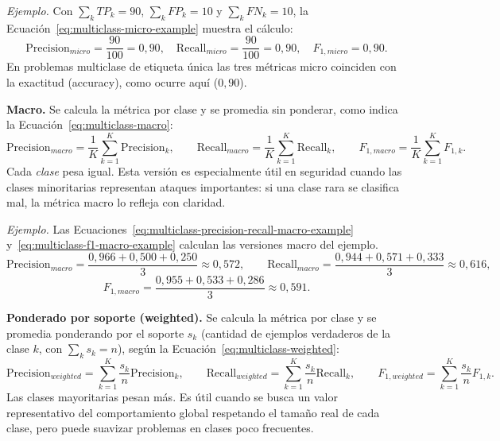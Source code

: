 \documentclass[12pt,oneside]{report}
\begin{document}
\emph{Ejemplo.} Con $\sum_k TP_k=90$, $\sum_k FP_k=10$ y $\sum_k FN_k=10$, la Ecuación~\eqref{eq:multiclass-micro-example} muestra el cálculo:
\begin{equation}
\label{eq:multiclass-micro-example}
\mathrm{Precision}_{micro}=\frac{90}{100}=0{,}90,\quad
\mathrm{Recall}_{micro}=\frac{90}{100}=0{,}90,\quad
F_{1,micro}=0{,}90.
\end{equation}
En problemas multiclase de etiqueta única las tres métricas micro coinciden con la exactitud (accuracy), como ocurre aquí ($0{,}90$).

\textbf{Macro.} Se calcula la métrica por clase y se promedia sin
ponderar, como indica la Ecuación~\eqref{eq:multiclass-macro}:
\begin{equation}
\label{eq:multiclass-macro}
\mathrm{Precision}_{macro}=\frac{1}{K}\sum_{k=1}^{K}\mathrm{Precision}_k,\qquad
\mathrm{Recall}_{macro}=\frac{1}{K}\sum_{k=1}^{K}\mathrm{Recall}_k,\qquad
F_{1,macro}=\frac{1}{K}\sum_{k=1}^{K}F_{1,k}.
\end{equation}
Cada \emph{clase} pesa igual. Esta versión es especialmente útil en seguridad cuando las clases minoritarias representan ataques importantes: si una clase rara se clasifica mal, la métrica macro lo refleja con claridad.

\emph{Ejemplo.} Las Ecuaciones~\eqref{eq:multiclass-precision-recall-macro-example} y~\eqref{eq:multiclass-f1-macro-example} calculan las versiones macro del ejemplo.
\begin{equation}
\label{eq:multiclass-precision-recall-macro-example}
\mathrm{Precision}_{macro}=\frac{0{,}966+0{,}500+0{,}250}{3}\approx 0{,}572,\qquad
\mathrm{Recall}_{macro}=\frac{0{,}944+0{,}571+0{,}333}{3}\approx 0{,}616,
\end{equation}
\begin{equation}
\label{eq:multiclass-f1-macro-example}
F_{1,macro}=\frac{0{,}955+0{,}533+0{,}286}{3}\approx 0{,}591.
\end{equation}

\textbf{Ponderado por soporte (weighted).} Se calcula la métrica por clase y se promedia ponderando por el soporte $s_k$ (cantidad de ejemplos verdaderos de la clase $k$, con $\sum_k s_k = n$), según la Ecuación~\eqref{eq:multiclass-weighted}:
\begin{equation}
\label{eq:multiclass-weighted}
\mathrm{Precision}_{weighted}=\sum_{k=1}^{K}\frac{s_k}{n}\mathrm{Precision}_k,\qquad
\mathrm{Recall}_{weighted}=\sum_{k=1}^{K}\frac{s_k}{n}\mathrm{Recall}_k,\qquad
F_{1,weighted}=\sum_{k=1}^{K}\frac{s_k}{n}F_{1,k}.
\end{equation}
Las clases mayoritarias pesan más. Es útil cuando se busca un valor representativo del comportamiento global respetando el tamaño real de cada clase, pero puede suavizar problemas en clases poco frecuentes.
\end{document}
